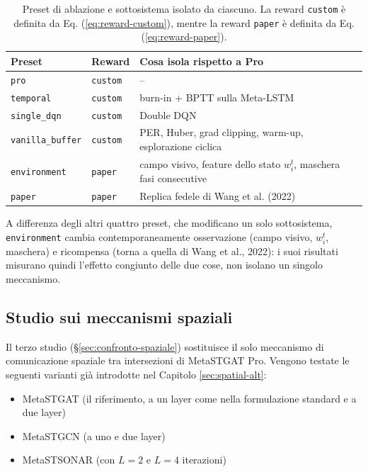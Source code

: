 \begin{table}[htbp]
  \centering
  \small
  \begin{tabular}{@{}llp{8.5cm}@{}}
    \toprule
    Preset                   & Reward          & Cosa isola rispetto a Pro                                            \\
    \midrule
    \texttt{pro}             & \texttt{custom} & --                                                                   \\
    \texttt{temporal}        & \texttt{custom} & burn-in + BPTT sulla Meta-LSTM                                       \\
    \texttt{single\_dqn}     & \texttt{custom} & Double DQN                                                           \\
    \texttt{vanilla\_buffer} & \texttt{custom} & PER, Huber, grad clipping, warm-up, esplorazione ciclica             \\
    \texttt{environment}     & \texttt{paper}  & campo visivo, feature dello stato $w_i^t$, maschera fasi consecutive \\
    \texttt{paper}           & \texttt{paper}  & Replica fedele di Wang et al. (2022)                                 \\
    \bottomrule
  \end{tabular}
  \caption{Preset di ablazione e sottosistema isolato da ciascuno. La reward \texttt{custom} è definita da Eq. (\ref{eq:reward-custom}), mentre la reward \texttt{paper} è definita da Eq. (\ref{eq:reward-paper}).}
  \label{tab:ablation-preset}
\end{table}

A differenza degli altri quattro preset, che modificano un solo sottosistema,
\texttt{environment} cambia contemporaneamente osservazione (campo visivo,
$w_i^t$, maschera) e ricompensa (torna a quella di Wang et al., 2022): i
suoi risultati misurano quindi l'effetto congiunto delle due cose, non
isolano un singolo meccanismo.

\subsection{Studio sui meccanismi spaziali}

Il terzo studio (§\ref{sec:confronto-spaziale}) sostituisce il solo
meccanismo di comunicazione spaziale tra intersezioni di MetaSTGAT Pro.
Vengono testate le seguenti varianti già introdotte nel Capitolo \ref{sec:spatial-alt}:
\begin{itemize}
  \item MetaSTGAT (il riferimento, a un layer come nella formulazione standard e a due layer)
  \item MetaSTGCN (a uno e due layer)
  \item MetaSTSONAR (con $L=2$ e $L=4$ iterazioni)
\end{itemize}

